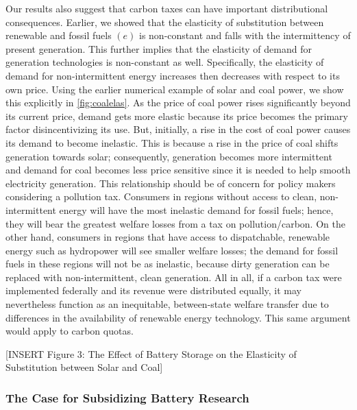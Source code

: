 \documentclass[11pt,a4paper,leqno]{extarticle}
\begin{document}
	Our results also suggest that carbon taxes can have important distributional consequences. Earlier, we showed that the elasticity of substitution between renewable and fossil fuels $(e)$ is non-constant and falls with the intermittency of present generation. This further implies that the elasticity of demand for generation technologies is non-constant as well. Specifically, the elasticity of demand for non-intermittent energy increases then decreases with respect to its own price. Using the earlier numerical example of solar and coal power, we show this explicitly in \autoref{fig:coalelas}. As the price of coal power rises significantly beyond its current price, demand gets more elastic because its price becomes the primary factor disincentivizing its use. But, initially, a rise in the cost of coal power causes its demand to become inelastic. This is because a rise in the price of coal shifts generation towards solar;  consequently, generation becomes more intermittent and demand for coal becomes less price sensitive since it is needed to help smooth electricity generation. This relationship should be of concern for policy makers considering a pollution tax. Consumers in regions without access to clean, non-intermittent energy will have the most inelastic demand for fossil fuels; hence, they will bear the greatest welfare losses from a tax on pollution/carbon. On the other hand, consumers in regions that have access to dispatchable, renewable energy such as hydropower will see smaller welfare losses; the demand for fossil fuels in these regions will not be as inelastic, because dirty generation can be replaced with non-intermittent, clean generation. All in all, if a carbon tax were implemented federally and its revenue were distributed equally, it may nevertheless function as an inequitable, between-state welfare transfer due to differences in the availability of renewable energy technology. This same argument would apply  to carbon quotas.
	
	
	\vspace{0.15in}
	\begin{center}
		[INSERT Figure 3: The Effect of Battery Storage on the Elasticity of Substitution between Solar and Coal]
	\end{center}
	\vspace{0.15in}
	

	
	\subsubsection{The Case for Subsidizing Battery Research}
	
\end{document}
